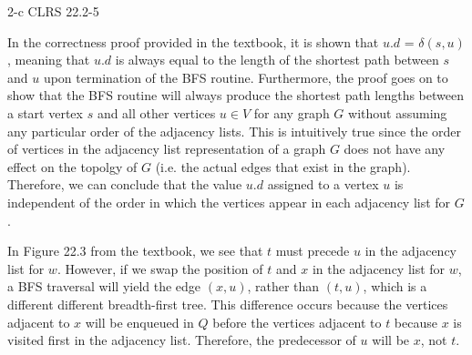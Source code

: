 \documentclass[11pt]{article}
\begin{document}
\begin{sol}
\begin{comment}
Finally, since after every traversal of the adjacency list of a vertex $v$ we are guaranteed to color the vertex black we know that any duplicate vertices that appear in $Q$ will not have any impact on the results of the BFS traversal. Furthermore, since the removal of the gray color does not change the breadth-first behavior of the traversal (because it does not modify the behavior of $Q$), we can conclude that the removal of the gray color altogether does not change the behavior of BFS; it simply poses the risk of a longer time complexity.
\end{comment}
\end{sol}

\begin{prob}{2-c}
CLRS 22.2-5 
\end{prob}
\begin{sol} 

In the correctness proof provided in the textbook, it is shown that $u.d$ = $\delta(s,u)$, meaning that $u.d$ is always equal to the length of the shortest path between $s$ and $u$ upon termination of the BFS routine. Furthermore, the proof goes on to show that the BFS routine will always produce the shortest path lengths between a start vertex $s$ and all other vertices $u \in V$ for any graph $G$ without assuming any particular order of the adjacency lists. This is intuitively true since the order of vertices in the adjacency list representation of a graph $G$ does not have any effect on the topolgy of $G$ (i.e. the actual edges that exist in the graph). Therefore, we can conclude that the value $u.d$ assigned to a vertex $u$ is independent of the order in which the vertices appear in each adjacency list for $G$.

In Figure 22.3 from the textbook, we see that $t$ must precede $u$ in the adjacency list for $w$. However, if we swap the position of $t$ and $x$ in the adjacency list for $w$, a BFS traversal will yield the edge $(x,u)$, rather than $(t,u)$, which is a different different breadth-first tree. This difference occurs because the vertices adjacent to $x$ will be enqueued in $Q$ before the vertices adjacent to $t$ because $x$ is visited first in the adjacency list. Therefore, the predecessor of $u$ will be $x$, not $t$.

\end{sol}
\end{document}
